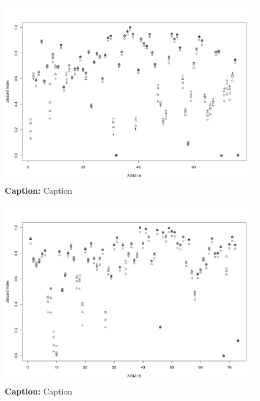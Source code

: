	\begin{landscape}
		\begin{figure}[ht]
				\centering
				\includegraphics[scale=.65]{img/jaccard_tiles_americas}
				\caption[Caption]{\textbf{Caption:} Caption}
				\label{fig:jaccard_americas_appendix}
		\end{figure}
	\end{landscape}

	\begin{landscape}
		\begin{figure}[ht]
			\centering
			\includegraphics[scale=.65]{img/jaccard_tiles_asia}
			\caption[Caption]{\textbf{Caption:} Caption}
			\label{fig:jaccard_asia_appendix}
		\end{figure}
	\end{landscape}

